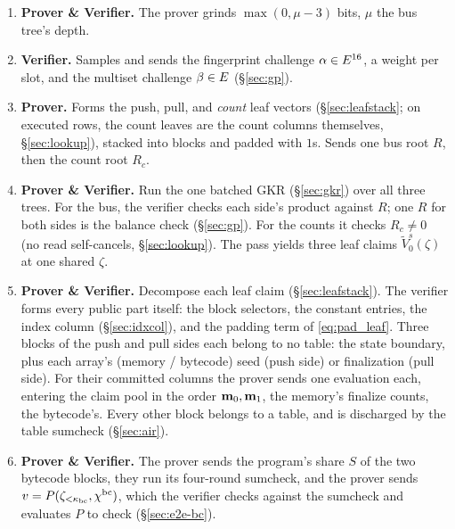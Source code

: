 \begin{enumerate}
\item \textbf{Prover \& Verifier.} The prover grinds $\max(0,\mu-3)$ bits, $\mu$ the bus tree's depth.
\item \textbf{Verifier.} Samples and sends the fingerprint challenge $\alpha\in E^{16}$, a weight per slot, and the multiset challenge $\beta\in E$ (\S\ref{sec:gp}).
\item \textbf{Prover.} Forms the push, pull, and \emph{count} leaf vectors (\S\ref{sec:leafstack}; on executed rows, the count leaves are the count columns themselves, \S\ref{sec:lookup}), stacked into blocks and padded with $1$s. Sends one bus root $R$, then the count root $R_c$.
\item \textbf{Prover \& Verifier.} Run the one batched GKR (\S\ref{sec:gkr}) over all three trees. For the bus, the verifier checks each side's product against $R$; one $R$ for both sides is the balance check (\S\ref{sec:gp}). For the counts it checks $R_c\neq0$ (no read self-cancels, \S\ref{sec:lookup}). The pass yields three leaf claims $\widetilde V^{s}_0(\zeta)$ at one shared $\zeta$.
\item \textbf{Prover \& Verifier.} Decompose each leaf claim (\S\ref{sec:leafstack}). The verifier forms every public part itself: the block selectors, the constant entries, the index column (\S\ref{sec:idxcol}), and the padding term of \eqref{eq:pad_leaf}. Three blocks of the push and pull sides each belong to no table: the state boundary, plus each array's (memory / bytecode) seed (push side) or finalization (pull side). For their committed columns the prover sends one evaluation each, entering the claim pool in the order $\mathbf{m}_0,\mathbf{m}_1$, the memory's finalize counts, the bytecode's. Every other block belongs to a table, and is discharged by the table sumcheck (\S\ref{sec:air}).
\item \textbf{Prover \& Verifier.} The prover sends the program's share $S$ of the two bytecode blocks, they run its four-round sumcheck, and the prover sends $v=P(\zeta_{<\kappa_{\mathrm{bc}}},\chi^{\mathrm{bc}})$, which the verifier checks against the sumcheck and evaluates $P$ to check (\S\ref{sec:e2e-bc}).
\end{enumerate}

